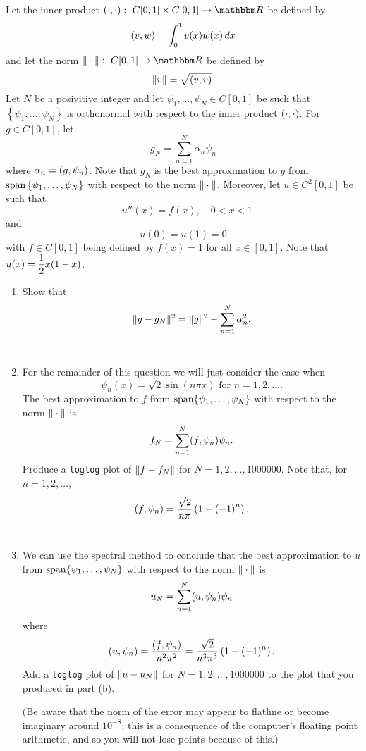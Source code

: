 
Let the inner product $\ip{\cdot,\cdot}:\mbox{ }C[0,1]\times C[0,1]\rightarrow\R$ be defined by
\[
(v,w)=\int_0^1v(x)w(x)\,dx
\]
and let the norm $\norm{\cdot}:\mbox{ }C[0,1]\rightarrow\R$ be defined by
\[
\|v\|=\sqrt{(v,v)}.
\]
Let $N$ be a posivitive integer and let $\psi_1,\ldots,\psi_N\in C[0,1]$ be such that $\left\{\psi_1,\ldots,\psi_N\right\}$ is orthonormal with respect to the inner product $(\cdot,\cdot)$. For $g\in C[0,1]$, let
\[
g_N=\sum_{n=1}^N\alpha_n\psi_n
\]
where $\alpha_n=(g,\psi_n)$. Note that $g_N$ is the best approximation to $g$ from ${\rm span}\left\{\psi_1,\ldots,\psi_N\right\}$ with respect to the norm $\|\cdot\|$. Moreover, let $u\in C^2[0,1]$ be such that
\[
-u''(x)=f(x),\quad 0<x<1
\]
and
\[
u(0)=u(1)=0
\]
with $f\in C[0,1]$ being defined by $f(x)=1$ for all $x\in[0,1]$. Note that $\displaystyle{u(x) = {1 \over 2}x(1-x)}$.
\\
\begin{enumerate}
\item Show that
\[
\|g-g_N\|^2  = \|g\|^2 - \sum_{n=1}^N \alpha_n^2.
\]
\\
\item For the remainder of this question we will just consider the case when
\[
\psi_n(x) = \sqrt{2} \sin(n \pi x)\mbox{ for }n=1,2,\ldots.
\]
The best approximation to $f$ from ${\rm span}\{\psi_1, \ldots, \psi_N\}$ with respect to the norm $\|\cdot\|$ is
\[ 
f_N = \sum_{n=1}^N (f,\psi_n) \psi_n.
\]
Produce a \verb|loglog| plot of $\|f-f_N\|$ for $N=1,2,\ldots, 1000000$. Note that, for $n=1,2,\ldots$,
\[
(f,\psi_n)={\sqrt{2} \over n\pi}\left(1-\left(-1\right)^n\right).
\]
\\
\item We can use the spectral method to conclude that the best approximation to $u$ from ${\rm span}\{\psi_1, \ldots, \psi_N\}$ with respect to the norm $\|\cdot\|$ is
\[ 
u_N = \sum_{n=1}^N (u,\psi_n) \psi_n
\]
where
\[
(u,\psi_n)={(f,\psi_n) \over n^2\pi^2}={\sqrt{2} \over n^3\pi^3}\left(1-\left(-1\right)^n\right).
\]
Add a \verb|loglog| plot of $\|u-u_N\|$ for $N=1,2,\ldots, 1000000$ to the plot that you produced in part (b).

(Be aware that the norm of the error may appear to flatline or become imaginary around $10^{-8}$: this is a consequence of the computer's floating point arithmetic, and so you will not lose points because of this.)
\end{enumerate}



